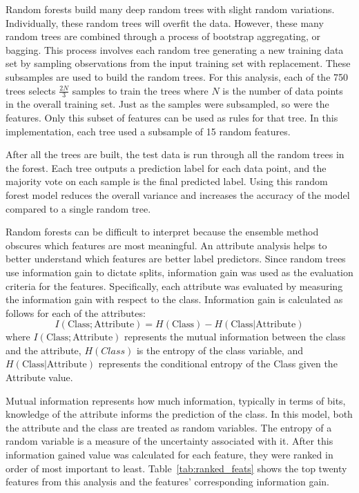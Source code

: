 \documentclass{article}
\begin{document}
Random forests build many deep random trees with slight random variations.  Individually, these random trees will overfit the data.  However, these many random trees are combined through a process of bootstrap aggregating, or bagging.  This process involves each random tree generating a new training data set by sampling observations from the input training set with replacement.  These subsamples are used to build the random trees.  For this analysis, each of the 750 trees selects $\frac{2N}{3}$ samples to train the trees where $N$ is the number of data points in the overall training set.  Just as the samples were subsampled, so were the features.  Only this subset of features can be used as rules for that tree.  In this implementation, each tree used a subsample of 15 random features.

After all the trees are built, the test data is run through all the random trees in the forest.  Each tree outputs a prediction label for each data point, and the majority vote on each sample is the final predicted label.  Using this random forest model reduces the overall variance and increases the accuracy of the model compared to a single random tree.

Random forests can be difficult to interpret because the ensemble method obscures which features are most meaningful.  An attribute analysis helps to better understand which features are better label predictors.  Since random trees use information gain to dictate splits, information gain was used as the evaluation criteria for the features.  Specifically, each attribute was evaluated by measuring the information gain with respect to the class.  Information gain is calculated as follows for each of the attributes:
\begin{equation}
I(\text{Class}; \text{Attribute}) = H(\text{Class}) - H(\text{Class} | \text{Attribute})
\end{equation} \label{eq:info_gained}
where $I(\text{Class}; \text{Attribute})$ represents the mutual information between the class and the attribute, $H(Class)$ is the entropy of the class variable, and  $H(\text{Class} | \text{Attribute})$ represents the conditional entropy of the Class given the Attribute value.  

Mutual information represents how much information, typically in terms of bits, knowledge of the attribute informs the prediction of the class.  In this model, both the attribute and the class are treated as random variables.  The entropy of a random variable is a measure of the uncertainty associated with it. After this information gained value was calculated for each feature, they were ranked in order of most important to least.  Table~\ref{tab:ranked_feats} shows the top twenty features from this analysis and the features' corresponding information gain.
\end{document}
